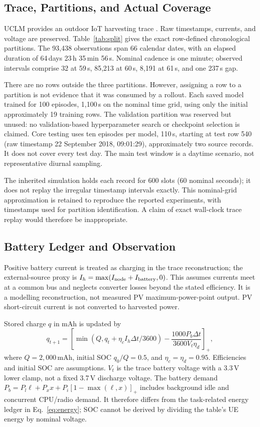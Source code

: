 \documentclass[conference]{IEEEtran}
\begin{document}
\subsection{Trace, Partitions, and Actual Coverage}
UCLM provides an outdoor IoT harvesting trace \cite{UCLM,UCLMData}. Raw timestamps, currents, and voltage are preserved. Table~\ref{tab:split} gives the exact row-defined chronological partitions. The 93,438 observations span 66 calendar dates, with an elapsed duration of 64\,days 23\,h 35\,min 56\,s. Nominal cadence is one minute; observed intervals comprise 32 at 59\,s, 85,213 at 60\,s, 8,191 at 61\,s, and one 237\,s gap.

There are no rows outside the three partitions. However, assigning a row to a partition is not evidence that it was consumed by a rollout. Each saved model trained for 100 episodes, 1,100\,s on the nominal time grid, using only the initial approximately 19 training rows. The validation partition was reserved but unused: no validation-based hyperparameter search or checkpoint selection is claimed. Core testing uses ten episodes per model, 110\,s, starting at test row 540 (raw timestamp 22 September 2018, 09:01:29), approximately two source records. It does not cover every test day. The main test window is a daytime scenario, not representative diurnal sampling.

The inherited simulation holds each record for 600 slots (60 nominal seconds); it does not replay the irregular timestamp intervals exactly. This nominal-grid approximation is retained to reproduce the reported experiments, with timestamps used for partition identification. A claim of exact wall-clock trace replay would therefore be inappropriate.

\subsection{Battery Ledger and Observation}
Positive battery current is treated as charging in the trace reconstruction; the external-source proxy is $I_h=\max(I_{\rm node}+I_{\rm battery},0)$. This assumes currents meet at a common bus and neglects converter losses beyond the stated efficiency. It is a modelling reconstruction, not measured PV maximum-power-point output. PV short-circuit current is not converted to harvested power.

Stored charge $q$ in mAh is updated by
\begin{equation}
q_{t+1}=\left[\min(Q,q_t+\eta_c I_h\Delta t/3600)-\frac{1000P_b\Delta t}{3600V_t\eta_d}\right]_+,
\label{eq:battery}
\end{equation}
where $Q=2,000$\,mAh, initial SOC $q_0/Q=0.5$, and $\eta_c=\eta_d=0.95$. Efficiencies and initial SOC are assumptions. $V_t$ is the trace battery voltage with a 3.3\,V lower clamp, not a fixed 3.7\,V discharge voltage. The battery demand $P_b=P_l\ell+P_xx+P_i[1-\max(\ell,x)]_+$ includes background idle and concurrent CPU/radio demand. It therefore differs from the task-related energy ledger in Eq.~\eqref{eq:energy}; SOC cannot be derived by dividing the table's UE energy by nominal voltage.
\end{document}
